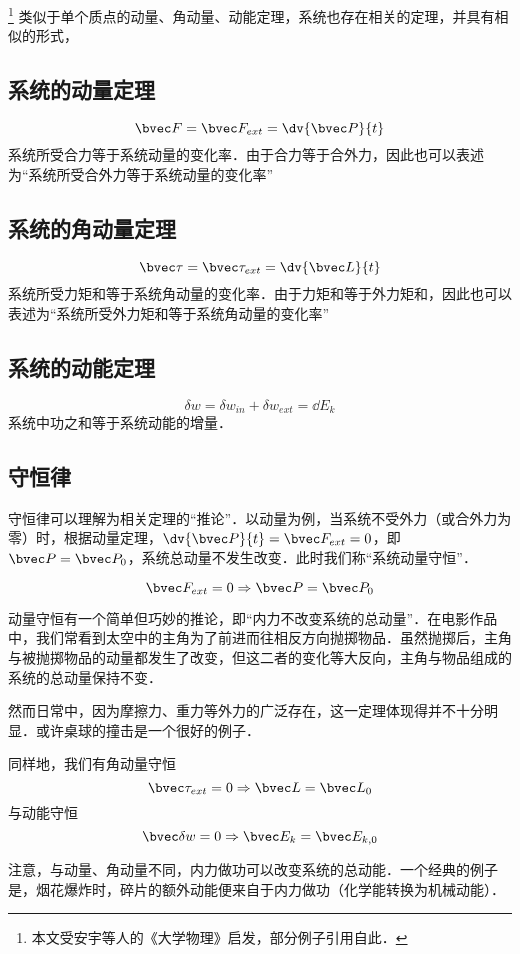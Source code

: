 \footnote{本文受安宇等人的《大学物理》启发，部分例子引用自此．}
类似于单个质点的动量、角动量、动能定理，系统也存在相关的定理，并具有相似的形式，

\subsection{系统的动量定理}
\begin{equation}
\bvec F = \bvec F_{ext} = \dv{\bvec P}{t}
\end{equation}
系统所受合力等于系统动量的变化率．由于合力等于合外力，因此也可以表述为“系统所受合外力等于系统动量的变化率”

\subsection{系统的角动量定理}
\begin{equation}
\bvec \tau = \bvec \tau_{ext} = \dv{\bvec L}{t}
\end{equation}
系统所受力矩和等于系统角动量的变化率．由于力矩和等于外力矩和，因此也可以表述为“系统所受外力矩和等于系统角动量的变化率”

\subsection{系统的动能定理}
\begin{equation}
\delta w =\delta w_{in} + \delta w_{ext} = \dd E_k
\end{equation}
系统中功之和等于系统动能的增量．

\subsection{守恒律}
守恒律可以理解为相关定理的“推论”．以动量为例，当系统不受外力（或合外力为零）时，根据动量定理，$\dv{\bvec P}{t} = \bvec F_{ext}=0$，即$\bvec P = \bvec P_0$，系统总动量不发生改变．此时我们称“系统动量守恒”．

\begin{equation}
\bvec F_{ext} = 0 \Rightarrow \bvec P = \bvec P_0
\end{equation}

动量守恒有一个简单但巧妙的推论，即“内力不改变系统的总动量”．在电影作品中，我们常看到太空中的主角为了前进而往相反方向抛掷物品．虽然抛掷后，主角与被抛掷物品的动量都发生了改变，但这二者的变化等大反向，主角与物品组成的系统的总动量保持不变．

然而日常中，因为摩擦力、重力等外力的广泛存在，这一定理体现得并不十分明显．或许桌球的撞击是一个很好的例子．

同样地，我们有角动量守恒
\begin{equation}
\bvec \tau_{ext} = 0 \Rightarrow \bvec L = \bvec L_0
\end{equation}
与动能守恒
\begin{equation}
\bvec \delta w = 0 \Rightarrow \bvec E_k = \bvec E_{k,0}
\end{equation}

注意，与动量、角动量不同，内力做功可以改变系统的总动能．一个经典的例子是，烟花爆炸时，碎片的额外动能便来自于内力做功（化学能转换为机械动能）．
